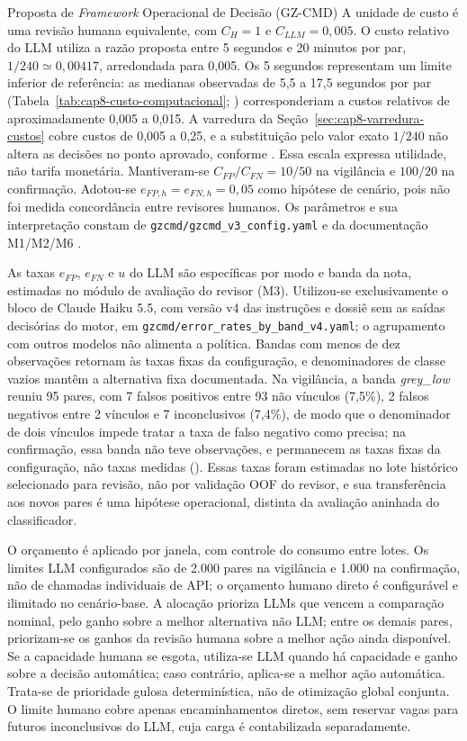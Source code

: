 \begin{chapter}{Proposta de \textit{Framework} Operacional de Decisão (GZ-CMD)}
A unidade de custo é uma revisão humana equivalente, com $C_H=1$ e $C_{LLM}=0{,}005$. O custo relativo do LLM utiliza a razão proposta entre 5 segundos e 20 minutos por par, $1/240\simeq0{,}00417$, arredondada para 0,005. Os 5 segundos representam um limite inferior de referência: as medianas observadas de 5,5 a 17,5 segundos por par (Tabela~\ref{tab:cap8-custo-computacional}; ) corresponderiam a custos relativos de aproximadamente 0,005 a 0,015. A varredura da Seção~\ref{sec:cap8-varredura-custos} cobre custos de 0,005 a 0,25, e a substituição pelo valor exato $1/240$ não altera as decisões no ponto aprovado, conforme . Essa escala expressa utilidade, não tarifa monetária. Mantiveram-se $C_{FP}/C_{FN}=10/50$ na vigilância e $100/20$ na confirmação. Adotou-se $e_{FP,h}=e_{FN,h}=0{,}05$ como hipótese de cenário, pois não foi medida concordância entre revisores humanos. Os parâmetros e sua interpretação constam de \texttt{gzcmd/gzcmd\_v3\_config.yaml} e da documentação M1/M2/M6 \cite{Jardim2026phdrepo}.

As taxas $e_{FP}$, $e_{FN}$ e $u$ do LLM são específicas por modo e banda da nota, estimadas no módulo de avaliação do revisor (M3). Utilizou-se exclusivamente o bloco de Claude Haiku 5.5, com versão v4 das instruções e dossiê sem as saídas decisórias do motor, em \texttt{gzcmd/error\_rates\_by\_band\_v4.yaml}; o agrupamento com outros modelos não alimenta a política. Bandas com menos de dez observações retornam às taxas fixas da configuração, e denominadores de classe vazios mantêm a alternativa fixa documentada. Na vigilância, a banda \textit{grey\_low} reuniu 95 pares, com 7 falsos positivos entre 93 não vínculos (7,5\%), 2 falsos negativos entre 2 vínculos e 7 inconclusivos (7,4\%), de modo que o denominador de dois vínculos impede tratar a taxa de falso negativo como precisa; na confirmação, essa banda não teve observações, e permanecem as taxas fixas da configuração, não taxas medidas (). Essas taxas foram estimadas no lote histórico selecionado para revisão, não por validação OOF do revisor, e sua transferência aos novos pares é uma hipótese operacional, distinta da avaliação aninhada do classificador.

O orçamento é aplicado por janela, com controle do consumo entre lotes. Os limites LLM configurados são de 2.000 pares na vigilância e 1.000 na confirmação, não de chamadas individuais de API; o orçamento humano direto é configurável e ilimitado no cenário-base. A alocação prioriza LLMs que vencem a comparação nominal, pelo ganho sobre a melhor alternativa não LLM; entre os demais pares, priorizam-se os ganhos da revisão humana sobre a melhor ação ainda disponível. Se a capacidade humana se esgota, utiliza-se LLM quando há capacidade e ganho sobre a decisão automática; caso contrário, aplica-se a melhor ação automática. Trata-se de prioridade gulosa determinística, não de otimização global conjunta. O limite humano cobre apenas encaminhamentos diretos, sem reservar vagas para futuros inconclusivos do LLM, cuja carga é contabilizada separadamente.


\end{chapter}
